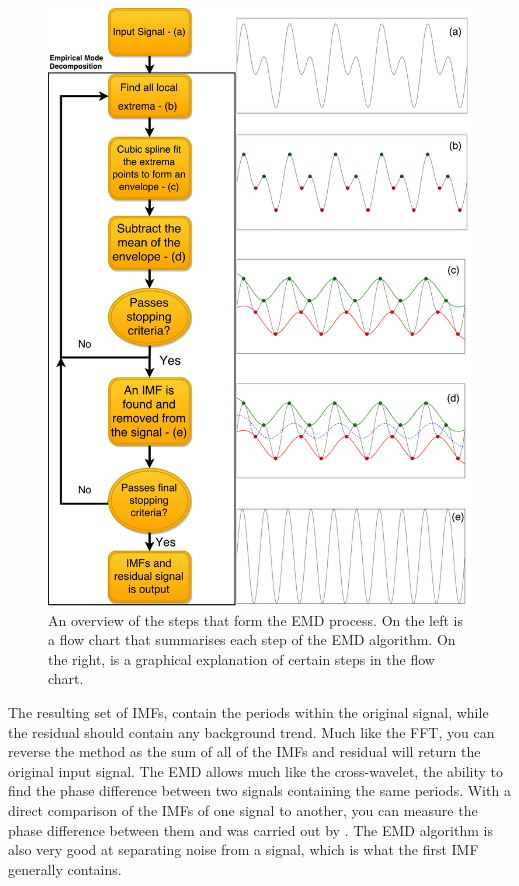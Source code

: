    	\begin{figure}
   		\centering
   		\includegraphics[width=1\textwidth]{EMD_FLOW.pdf}
   		\caption{
   			     An overview of the steps that form the EMD process. 
   			     On the left is a flow chart that summarises each step of the EMD algorithm.
   			     On the right, is a graphical explanation of certain steps in the flow chart. 
   		        }
   		\label{fig:EMD}
   	\end{figure}
   	    
    The resulting set of IMFs, contain the periods within the original signal, while the residual should contain any background trend.
    Much like the FFT, you can reverse the method as the sum of all of the IMFs and residual will return the original input signal.
    The EMD allows much like the cross-wavelet, the ability to find the phase difference between two signals containing the same periods.
    With a direct comparison of the IMFs of one signal to another, you can measure the phase difference between them and was carried out by \cite{morton2011}.
    The EMD algorithm is also very good at separating noise from a signal, which is what the first IMF generally contains.
   
